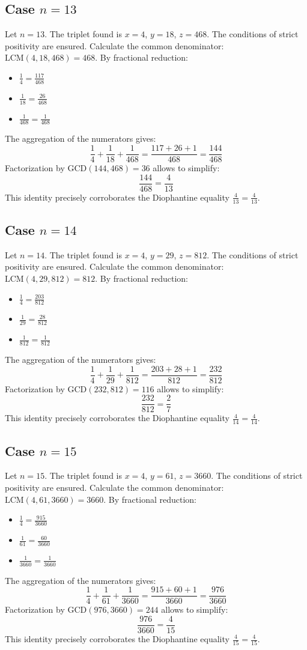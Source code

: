 \documentclass[11pt,a4paper]{article}
\begin{document}
\subsection{Case $n = 13$}
Let $n = 13$. The triplet found is $x = 4$, $y = 18$, $z = 468$.
The conditions of strict positivity are ensured.
Calculate the common denominator: $\text{LCM}(4, 18, 468) = 468$.
By fractional reduction:
\begin{itemize}
    \item $\frac{1}{4} = \frac{117}{468}$
    \item $\frac{1}{18} = \frac{26}{468}$
    \item $\frac{1}{468} = \frac{1}{468}$
\end{itemize}
The aggregation of the numerators gives:
$$ \frac{1}{4} + \frac{1}{18} + \frac{1}{468} = \frac{117 + 26 + 1}{468} = \frac{144}{468} $$
Factorization by $\text{GCD}(144, 468) = 36$ allows to simplify:
$$ \frac{144}{468} = \frac{4}{13} $$
This identity precisely corroborates the Diophantine equality $\frac{4}{13} = \frac{4}{13}$.

\subsection{Case $n = 14$}
Let $n = 14$. The triplet found is $x = 4$, $y = 29$, $z = 812$.
The conditions of strict positivity are ensured.
Calculate the common denominator: $\text{LCM}(4, 29, 812) = 812$.
By fractional reduction:
\begin{itemize}
    \item $\frac{1}{4} = \frac{203}{812}$
    \item $\frac{1}{29} = \frac{28}{812}$
    \item $\frac{1}{812} = \frac{1}{812}$
\end{itemize}
The aggregation of the numerators gives:
$$ \frac{1}{4} + \frac{1}{29} + \frac{1}{812} = \frac{203 + 28 + 1}{812} = \frac{232}{812} $$
Factorization by $\text{GCD}(232, 812) = 116$ allows to simplify:
$$ \frac{232}{812} = \frac{2}{7} $$
This identity precisely corroborates the Diophantine equality $\frac{4}{14} = \frac{4}{14}$.

\subsection{Case $n = 15$}
Let $n = 15$. The triplet found is $x = 4$, $y = 61$, $z = 3660$.
The conditions of strict positivity are ensured.
Calculate the common denominator: $\text{LCM}(4, 61, 3660) = 3660$.
By fractional reduction:
\begin{itemize}
    \item $\frac{1}{4} = \frac{915}{3660}$
    \item $\frac{1}{61} = \frac{60}{3660}$
    \item $\frac{1}{3660} = \frac{1}{3660}$
\end{itemize}
The aggregation of the numerators gives:
$$ \frac{1}{4} + \frac{1}{61} + \frac{1}{3660} = \frac{915 + 60 + 1}{3660} = \frac{976}{3660} $$
Factorization by $\text{GCD}(976, 3660) = 244$ allows to simplify:
$$ \frac{976}{3660} = \frac{4}{15} $$
This identity precisely corroborates the Diophantine equality $\frac{4}{15} = \frac{4}{15}$.
\end{document}
